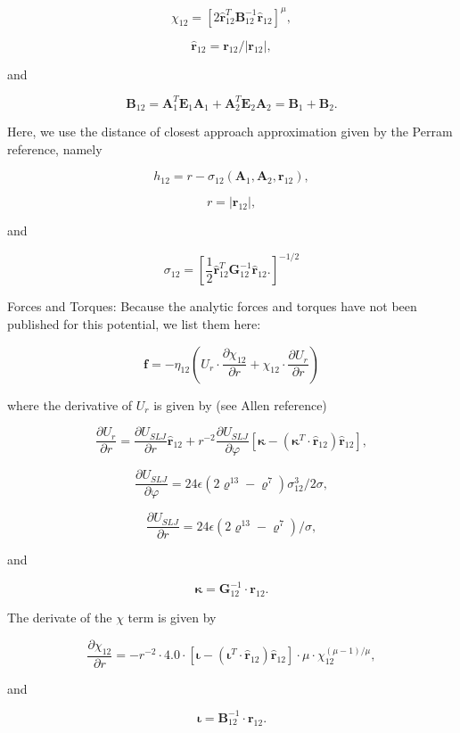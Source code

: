 $$ \chi_{12} = [2 \hat{\mathbf{r}}_{12}^T \mathbf{B}_{12}^{-1}
\hat{\mathbf{r}}_{12}]^\mu, $$

$$ \hat{\mathbf{r}}_{12} = { \mathbf{r}_{12} } / |\mathbf{r}_{12}|, $$

and

$$ \mathbf{B}_{12} = \mathbf{A}_1^T \mathbf{E}_1 \mathbf{A}_1 +
\mathbf{A}_2^T \mathbf{E}_2 \mathbf{A}_2 = \mathbf{B}_1 +
\mathbf{B}_2. $$

Here, we use the distance of closest approach approximation given by the
Perram reference, namely

$$ h_{12} = r - \sigma_{12} ( \mathbf{A}_1, \mathbf{A}_2,
\mathbf{r}_{12} ), $$

$$ r = |\mathbf{r}_{12}|, $$

and

$$ \sigma_{12} = [ \frac{1}{2} \hat{\mathbf{r}}_{12}^T
\mathbf{G}_{12}^{-1} \hat{\mathbf{r}}_{12}.]^{ -1/2 } $$

Forces and Torques: Because the analytic forces and torques have not
been published for this potential, we list them here:

$$ \mathbf{f} = - \eta_{12} ( U_r \cdot { \frac{\partial \chi_{12}
}{\partial r} } + \chi_{12} \cdot { \frac{\partial U_r }{\partial r} }
) $$

where the derivative of $U_r$ is given by (see Allen reference)

$$ \frac{\partial U_r }{\partial r} = \frac{ \partial U_{SLJ} }{
\partial r } \hat{\mathbf{r}}_{12} + r^{-2} \frac{ \partial U_{SLJ} }{
\partial \varphi } [ \mathbf{\kappa} - ( \mathbf{\kappa}^T \cdot
\hat{\mathbf{r}}_{12}) \hat{\mathbf{r}}_{12} ], $$

$$ \frac{ \partial U_{SLJ} }{ \partial \varphi } = 24 \epsilon ( 2
\varrho^{13} - \varrho^7 ) \sigma_{12}^3 / 2 \sigma, $$

$$ \frac{ \partial U_{SLJ} }{ \partial r } = 24 \epsilon ( 2
\varrho^{13} - \varrho^7 ) / \sigma, $$

and

$$ \mathbf{\kappa} = \mathbf{G}_{12}^{-1} \cdot \mathbf{r}_{12}. $$

The derivate of the $\chi$ term is given by

$$ \frac{\partial \chi_{12} }{\partial r} = - r^{-2} \cdot 4.0 \cdot [
\mathbf{\iota} - ( \mathbf{\iota}^T \cdot \hat{\mathbf{r}}_{12} )
\hat{\mathbf{r}}_{12} ] \cdot \mu \cdot \chi_{12}^{ ( \mu -1 ) / \mu
}, $$

and

$$ \mathbf{\iota} = \mathbf{B}_{12}^{-1} \cdot \mathbf{r}_{12}. $$

